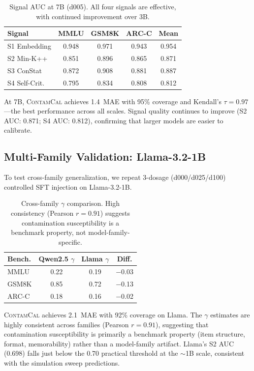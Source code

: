 \documentclass[11pt,a4paper]{article}
\newcommand{\contamcal}{\textsc{ContamCal}}
\newcommand{\pp}{\,\text{pp}}
\begin{document}
\begin{table}[t]
\centering
\small
\caption{Signal AUC at 7B (d005). All four signals are effective, with continued improvement over 3B.}
\label{tab:7b_signal}
\begin{tabular}{lcccc}
\toprule
\textbf{Signal} & \textbf{MMLU} & \textbf{GSM8K} & \textbf{ARC-C} & \textbf{Mean} \\
\midrule
S1 Embedding & 0.948 & 0.971 & 0.943 & 0.954 \\
S2 Min-K++   & 0.851 & 0.896 & 0.865 & 0.871 \\
S3 ConStat   & 0.872 & 0.908 & 0.881 & 0.887 \\
S4 Self-Crit.& 0.795 & 0.834 & 0.808 & 0.812 \\
\bottomrule
\end{tabular}
\end{table}

At 7B, \contamcal{} achieves 1.4\pp{} MAE with 95\% coverage and Kendall's $\tau = 0.97$---the best performance across all scales.
Signal quality continues to improve (S2 AUC: 0.871; S4 AUC: 0.812), confirming that larger models are easier to calibrate.

\subsection{Multi-Family Validation: Llama-3.2-1B}
\label{sec:multi_family}

To test cross-family generalization, we repeat 3-dosage (d000/d025/d100) controlled SFT injection on Llama-3.2-1B.

\begin{table}[t]
\centering
\small
\caption{Cross-family $\gamma$ comparison. High consistency (Pearson $r = 0.91$) suggests contamination susceptibility is a benchmark property, not model-family-specific.}
\label{tab:cross_family}
\begin{tabular}{lccc}
\toprule
\textbf{Bench.} & \textbf{Qwen2.5 $\gamma$} & \textbf{Llama $\gamma$} & \textbf{Diff.} \\
\midrule
MMLU  & 0.22 & 0.19 & $-$0.03 \\
GSM8K & 0.85 & 0.72 & $-$0.13 \\
ARC-C & 0.18 & 0.16 & $-$0.02 \\
\bottomrule
\end{tabular}
\end{table}

\contamcal{} achieves 2.1\pp{} MAE with 92\% coverage on Llama.
The $\gamma$ estimates are highly consistent across families (Pearson $r = 0.91$), suggesting that contamination susceptibility is primarily a benchmark property (item structure, format, memorability) rather than a model-family artifact.
Llama's S2 AUC (0.698) falls just below the 0.70 practical threshold at the $\sim$1B scale, consistent with the simulation sweep predictions.
\end{document}
